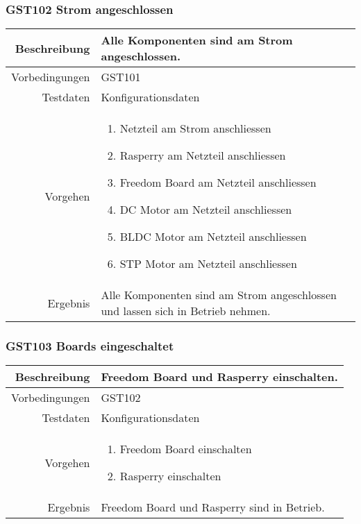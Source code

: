 \subsubsection{GST102 Strom angeschlossen}
\begin{table}[h!]
	\renewcommand{\arraystretch}{1.5}
	\begin{tabular}{|r|p{13cm}|}
		\hline Beschreibung & Alle Komponenten sind am Strom angeschlossen. \\ 
		\hline Vorbedingungen &  GST101\\ 
		\hline Testdaten & Konfigurationsdaten \\ 
		\hline Vorgehen & 
		\begin{enumerate}
			\item Netzteil am Strom anschliessen
			\item Rasperry am Netzteil anschliessen
			\item Freedom Board am Netzteil anschliessen
			\item DC Motor am Netzteil anschliessen
			\item BLDC Motor am Netzteil anschliessen
			\item STP Motor am Netzteil anschliessen
		\end{enumerate} \\ 
		\hline Ergebnis & Alle Komponenten sind am Strom angeschlossen und lassen sich in Betrieb nehmen. \\ 
		\hline 
	\end{tabular}
\end{table}
\newpage

\subsubsection{GST103 Boards eingeschaltet}
\begin{table}[h!]
	\renewcommand{\arraystretch}{1.5}
	\begin{tabular}{|r|p{13cm}|}
		\hline Beschreibung & Freedom Board und Rasperry einschalten. \\ 
		\hline Vorbedingungen &  GST102\\ 
		\hline Testdaten & Konfigurationsdaten \\ 
		\hline Vorgehen & 
		\begin{enumerate}
			\item Freedom Board einschalten
			\item Rasperry einschalten
		\end{enumerate} \\ 
		\hline Ergebnis & Freedom Board und Rasperry sind in Betrieb. \\ 
		\hline 
	\end{tabular}
\end{table}

